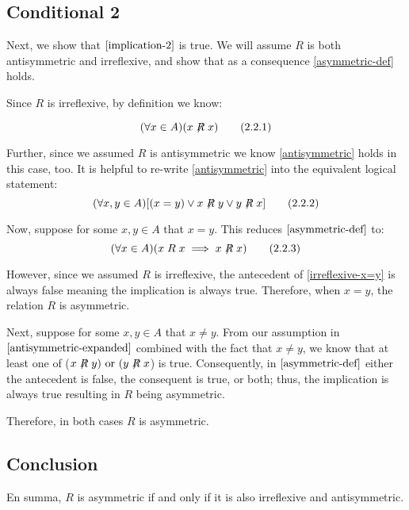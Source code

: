\documentclass{article}
\begin{document}
\subsection{Conditional 2}
Next, we show that $\eqref{implication-2}$ is true. We will assume $R$ is both antisymmetric and irreflexive, and show that as a consequence \eqref{asymmetric-def} holds.

Since $R$ is irreflexive, by definition we know:

\[
(\forall x \in A)(x \not\mathrel{R} x) \tag{2.2.1}\label{irreflexive-def}
\]

Further, since we assumed $R$ is antisymmetric we know \eqref{antisymmetric} holds in this case, too. It is helpful to re-write \eqref{antisymmetric} into the equivalent logical statement:
\[
(\forall x,y \in A)[(x=y) \lor x \not\mathrel{R} y \lor y \not\mathrel{R} x] \tag{2.2.2} \label{antisymmetric-expanded}
\]

Now, suppose for some $x,y \in A$ that $x = y$. This reduces $\eqref{asymmetric-def}$ to:
\[
(\forall x \in A) (x \mathrel{R} x \implies x \not\mathrel{R} x) \tag{2.2.3} \label{irreflexive-x=y}
\]

However, since we assumed $R$ is irreflexive, the antecedent of \eqref{irreflexive-x=y} is always false meaning the implication is always true. Therefore, when $x=y$, the relation $R$ is asymmetric.

Next, suppose for some $x,y \in A$ that $x \neq y$. From our assumption in $\eqref{antisymmetric-expanded}$ combined with the fact that $x \neq y$, we know that at least one of ($x\not\mathrel{R}y) \text{ or } (y\not\mathrel{R}x$) is true. Consequently, in $\eqref{asymmetric-def}$ either the antecedent is false, the consequent is true, or both; thus, the implication is always true resulting in $R$ being asymmetric.

Therefore, in both cases $R$ is asymmetric.

\subsection{Conclusion}
En summa, $R$ is asymmetric if and only if it is also irreflexive and antisymmetric.
\end{document}
